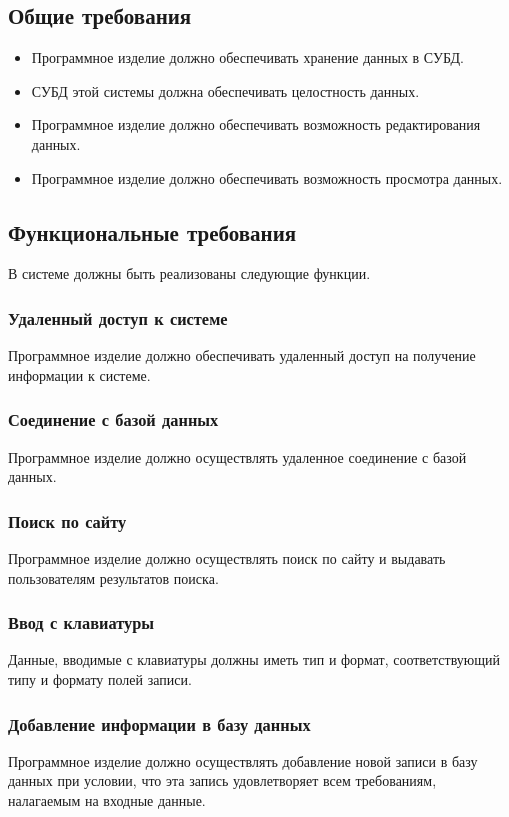 \documentclass[russian,utf8,emptystyle]{eskdtext}
\begin{document}
\subsection{Общие требования}

\begin{itemize}
\item Программное изделие должно обеспечивать хранение данных в СУБД.
\item СУБД этой системы должна обеспечивать целостность данных.
\item Программное изделие должно обеспечивать возможность редактирования данных.
\item Программное изделие должно обеспечивать возможность просмотра данных.
\end{itemize}

\subsection{Функциональные требования}
В системе должны быть реализованы следующие функции.

\subsubsection{Удаленный доступ к системе}
Программное изделие должно обеспечивать удаленный доступ на получение информации к системе.

\subsubsection{Соединение с базой данных}
Программное изделие должно осуществлять удаленное соединение с базой данных.

\subsubsection{Поиск по сайту}
Программное изделие должно осуществлять поиск по сайту и выдавать пользователям результатов поиска.

\subsubsection{Ввод с клавиатуры}
Данные, вводимые с клавиатуры должны иметь тип и формат, соответствующий типу и формату полей записи.

\subsubsection{Добавление информации в базу данных}
Программное изделие должно осуществлять добавление новой записи в базу данных при условии, что эта запись удовлетворяет всем требованиям, налагаемым на входные данные.
\end{document}
